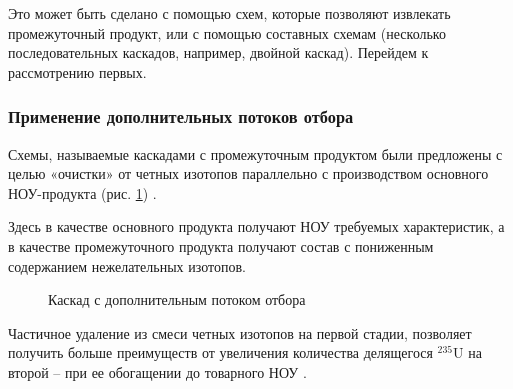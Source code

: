 Это может быть сделано с помощью схем, которые позволяют извлекать промежуточный продукт, или с помощью составных схемам (несколько последовательных каскадов, например, двойной каскад).
Перейдем к рассмотрению первых.

\subsubsection{Применение дополнительных потоков отбора}
Схемы, называемые каскадами с промежуточным продуктом были предложены с целью «очистки» от четных изотопов параллельно с производством основного НОУ-продукта (рис. \ref{fig:3_out}) \cite{zhurinSPOSOBPERERABOTKIZAGRYaZNENNOGO, palkinAnaliticheskiyRaschetSoderzhaniya2007}.

Здесь в качестве основного продукта получают НОУ требуемых характеристик, а в качестве промежуточного продукта получают состав с пониженным содержанием нежелательных изотопов.
\begin{figure}[ht]
  \caption{Каскад с дополнительным потоком отбора}\label{fig:3_out}
\end{figure}

Частичное удаление из смеси четных изотопов на первой стадии, позволяет получить больше преимуществ от увеличения количества делящегося $^{235}$U на второй -- при ее обогащении до товарного НОУ \cite{palkinSeparationUraniumIsotopes2010}.

